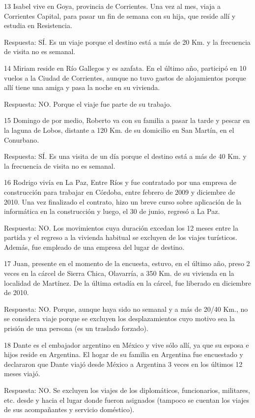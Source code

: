 \documentclass[
  openany]{book}
\begin{document}
13 Isabel vive en Goya, provincia de Corrientes. Una vez al mes, viaja a Corrientes Capital, para pasar un fin de semana con su hija, que reside allí y estudia en Resistencia.

Respuesta: SÍ. Es un viaje porque el destino está a más de 20 Km. y la frecuencia de visita no es semanal.

14 Miriam reside en Río Gallegos y es azafata. En el último año, participó en 10 vuelos a la Ciudad de Corrientes, aunque no tuvo gastos de alojamientos porque allí tiene una amiga y pasa la noche en su vivienda.

Respuesta: NO. Porque el viaje fue parte de su trabajo.

15 Domingo de por medio, Roberto va con su familia a pasar la tarde y pescar en la laguna de Lobos, distante a 120 Km. de su domicilio en San Martín, en el Conurbano.

Respuesta: SÍ. Es una visita de un día porque el destino está a más de 40 Km. y la frecuencia de visita no es semanal.

16 Rodrigo vivía en La Paz, Entre Ríos y fue contratado por una empresa de construcción para trabajar en Córdoba, entre febrero de 2009 y diciembre de 2010. Una vez finalizado el contrato, hizo un breve curso sobre aplicación de la informática en la construcción y luego, el 30 de junio, regresó a La Paz.

Respuesta: NO. Los movimientos cuya duración excedan los 12 meses entre la partida y el regreso a la vivienda habitual se excluyen de los viajes turísticos. Además, fue empleado de una empresa del lugar de destino.

17 Juan, presente en el momento de la encuesta, estuvo, en el último año, preso 2 veces en la cárcel de Sierra Chica, Olavarría, a 350 Km. de su vivienda en la localidad de Martínez. De la última estadía en la cárcel, fue liberado en diciembre de 2010.

Respuesta: NO. Porque, aunque haya sido no semanal y a más de 20/40 Km., no se considera viaje porque se excluyen los desplazamientos cuyo motivo sea la prisión de una persona (es un traslado forzado).

18 Dante es el embajador argentino en México y vive sólo allí, ya que su esposa e hijos reside en Argentina. El hogar de su familia en Argentina fue encuestado y declararon que Dante viajó desde México a Argentina 3 veces en los últimos 12 meses viajó.

Respuesta: NO. Se excluyen los viajes de los diplomáticos, funcionarios, militares, etc. desde y hacia el lugar donde fueron asignados (tampoco se cuentan los viajes de sus acompañantes y servicio doméstico).
\end{document}
